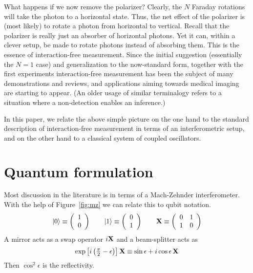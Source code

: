 \documentclass[12pt,aps,prb,preprint]{revtex4}
\def\ket#1{|#1\rangle}
\def\X{{\bf X}}
\begin{document}
What happens if we now remove the polarizer?  Clearly, the $N$ Faraday
rotations will take the photon to a horizontal state.  Thus, the net
effect of the polarizer is (most likely) to rotate a photon from
horizontal to vertical.  Recall that the polarizer is really just an
absorber of horizontal photons.  Yet it can, within a clever setup, be
made to rotate photons instead of absorbing them.  This is the essence
of interaction-free measurement.  Since the initial suggestion
(essentially the $N=1$ case)\cite{1993FoPh...23..987E} and
generalization to the now-standard form, together with the first
experiments\cite{PhysRevLett.74.4763} interaction-free measurement has
been the subject of many
demonstrations\cite{voorthuysen:1504,2006JPhB...39.3177N} and
reviews,\cite{deweerd:272} and applications aiming towards medical
imaging are starting to appear\cite{PhysRevA.80.040902}.  (An older
usage of similar
terminalogy\cite{springerlink:10.1007/BF01327019,dicke:925} refers to
a situation where a non-detection enables an inference.)

In this paper, we relate the above simple picture on the one hand to
the standard description of interaction-free measurement in terms of
an interferometric setup, and on the other hand to a classical system
of coupled oscillators.

\section{Quantum formulation}

Most discussion in the literature is in terms of a Mach-Zehnder
interferometer.  With the help of Figure~{\ref{fig:mz}} we can relate
this to qubit notation.
\begin{equation}
\ket0 \equiv \left( \begin{array}{c} 1 \\ 0 \end{array} \right)  \qquad
\ket1 \equiv \left( \begin{array}{c} 0 \\ 1 \end{array} \right)  \qquad
\X \equiv \left( \begin{array}{cc} 0 & 1 \\ 1 & 0 \end{array} \right)
\end{equation}
A mirror acts as a swap operator $i\X$ and a beam-splitter acts as
\begin{equation}
\exp\left[i\left({\textstyle\frac\pi2-\epsilon}\right)\right] \X \equiv
\sin\epsilon + i\cos\epsilon\,\X
\end{equation}
Then $\cos^2\epsilon$ is the reflectivity.
\end{document}
